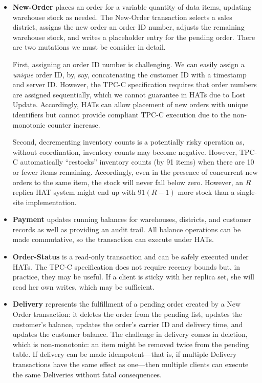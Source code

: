\begin{itemize}
\item \textbf{New-Order} places an order for a variable quantity of
  data items, updating warehouse stock as needed. The New-Order
  transaction selects a sales district, assigns the new order an order
  ID number, adjusts the remaining warehouse stock, and writes a
  placeholder entry for the pending order. There are two mutations we
  must be consider in detail.

  First, assigning an order ID number is challenging. We can easily
  assign a \textit{unique} order ID, by, say, concatenating the
  customer ID with a timestamp and server ID. However, the TPC-C
  specification requires that order numbers are assigned sequentially,
  which we cannot guarantee in HATs due to Lost Update. Accordingly,
  HATs can allow placement of new orders with unique identifiers but
  cannot provide compliant TPC-C execution due to the non-monotonic
  counter increase.

  Second, decrementing inventory counts is a potentially risky
  operation as, without coordination, inventory counts may become
  negative. However, TPC-C automatically ``restocks'' inventory counts
  (by 91 items) when there are 10 or fewer items
  remaining. Accordingly, even in the presence of concurrent new
  orders to the same item, the stock will never fall below
  zero. However, an $R$ replica HAT system might end up with $91(R-1)$
  more stock than a single-site implementation.

\item \textbf{Payment} updates running balances for warehouses,
  districts, and customer records as well as providing an audit
  trail. All balance operations can be made commutative, so the
  transaction can execute under HATs.

\item \textbf{Order-Status} is a read-only transaction and can be
  safely executed under HATs. The TPC-C specification does not require
  recency bounds but, in practice, they may be useful. If a client is
  sticky with her replica set, she will read her own writes, which may
  be sufficient.

\item \textbf{Delivery} represents the fulfillment of a pending order
  created by a New Order transaction: it deletes the order from the
  pending list, updates the customer's balance, updates the order's
  carrier ID and delivery time, and updates the customer balance. The
  challenge in delivery comes in deletion, which is non-monotonic: an
  item might be removed twice from the pending table. If delivery can
  be made idempotent---that is, if multiple Delivery transactions have
  the same effect as one---then multiple clients can execute the same
  Deliveries without fatal consequences.


\end{itemize}
